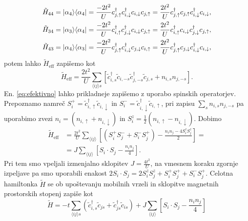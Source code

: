 {\begin{appendices}
\begin{equation}
\begin{aligned}
&\tilde{H}_{44}=\vert\alpha_4\rangle\langle \alpha_4 \vert=\frac{-2t^2}{U} c^\dagger_{j,\uparrow}c^\dagger_{i,\downarrow}c_{i,\downarrow}c_{j,\uparrow}= \frac{2t^2}{U}c^\dagger_{j,\uparrow}c_{j,\uparrow}c^\dagger_{i,\downarrow}c_{i,\downarrow},\\
&\tilde{H}_{34}=\vert\alpha_3\rangle\langle \alpha_4 \vert=\frac{-2t^2}{U} c^\dagger_{i,\uparrow}c^\dagger_{j,\downarrow}c_{i,\downarrow}c_{j,\uparrow}= \frac{2t^2}{U}c^\dagger_{i,\uparrow}c_{i,\downarrow}c^\dagger_{j,\downarrow}c_{j,\uparrow},\\
&\tilde{H}_{43}=\vert\alpha_4\rangle\langle \alpha_3 \vert=\frac{-2t^2}{U} c^\dagger_{j,\uparrow}c^\dagger_{i,\downarrow}c_{j,\downarrow}c_{i,\uparrow}= \frac{2t^2}{U}c^\dagger_{j,\uparrow}c_{j,\downarrow}c^\dagger_{i,\downarrow}c_{i,\downarrow},
\end{aligned}
\end{equation}
potem lahko  $\tilde{H}_\mathrm{eff}$ zapišemo kot 
\begin{equation}\label{eq:efektivno}
\tilde{H}_\mathrm{eff} = \frac{2t^2}{U}\sum\limits_{\langle ij\rangle s } \left[\tilde{c}^\dagger_{i,s}\tilde{c}_{i,-s}\tilde{c}^\dagger_{j,-s}\tilde{c}_{j,s} + n_{i,s}n_{j,-s}  \right].
\end{equation}
En. \eqref{eq:efektivno} lahko prikladneje zapišemo z uporabo spinskih operatorjev. Prepoznamo namreč $S_i^+=\tilde{c}^\dagger_{i,\uparrow}\tilde{c}_{i,\downarrow}$ in $S_i^-=\tilde{c}^\dagger_{i,\downarrow}\tilde{c}_{i,\uparrow}$, pri zapisu $\sum\limits_{s} n_{i,s}n_{j,-s}$ pa uporabimo zvezi $n_i=\left( n_{i,\uparrow} + n_{i, \downarrow}\right)$ in $S_i^z=\frac{1}{2}\left(n_{i, \uparrow} - n_{i, \downarrow} \right)$. Dobimo
\begin{equation}\label{eq:mat_elti}
\begin{split}
\tilde{H}_\mathrm{eff}& = \frac{2t^2}{U} \sum\limits_{\langle ij \rangle}\left[ \left( S_i^+S_j^- + S_i^-S_j^+\right) - \frac{n_i n_j - 4S_i^zS_j^z}{2}\right]=\\
&=J\sum\limits_{\langle ij \rangle} \left[ S_i\cdot  S_j - \frac{n_i n_j}{4}\right].
\end{split}
\end{equation}
Pri tem smo vpeljali izmenjalno sklopitev $J=\frac{4t^2}{U}$, na vmesnem koraku zgornje izpeljave pa smo uporabili enakost $2S_i\cdot S_j = 2S_i^z S_j^z + S_i^+S_j^+ + S_i^-S_j^+$. Celotna hamiltonka $\tilde{H}$ se ob upoštevanju mobilnih vrzeli in sklopitve magnetnih prostorskih stopenj zapiše kot 
\begin{equation}\label{eq:tjhamiltonka}
\tilde{H} = -t\sum\limits_{\langle ij \rangle s} \left(\tilde{c}^\dagger_{i,s} \tilde{c}_{js} + \tilde{c}^\dagger_{js}\tilde{c}_{is}\right) +  J\sum\limits_{\langle ij \rangle} \left[ S_i\cdot  S_j - \frac{n_i n_j}{4}\right]
\end{equation}

\end{appendices}}
